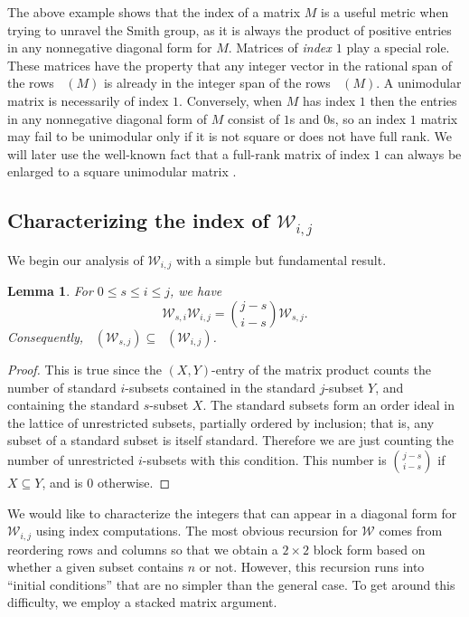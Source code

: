 \documentclass[11pt]{article}
\newtheorem{lemma}[theo]{Lemma}
\theoremstyle{definition}
\numberwithin{equation}{section}
\numberwithin{equation}{section}
\DeclareMathOperator{\rowz}{row_{\mathbb{Z}}}
\DeclareMathOperator{\rowq}{row_{\mathbb{Q}}}
\newcommand{\W}{\mathcal{W}}
\begin{document}
The above example shows that the index of a matrix $M$ is a useful metric when trying to unravel the Smith group, as it is always the product of positive entries in any nonnegative diagonal form for $M$.  Matrices of {\em index $\mathit 1$} play a special role.  These matrices have the property that any integer vector in the rational span of the rows $\rowq(M)$ is already in the integer span of the rows $\rowz(M)$.  A unimodular matrix is necessarily of index $1$.  Conversely, when $M$ has index $1$ then the entries in any nonnegative diagonal form of $M$ consist of $1$s and $0$s, so an index $1$ matrix may fail to be unimodular only if it is not square or does not have full rank.  We will later use the well-known fact that a full-rank matrix of index $1$ can always be enlarged to a square unimodular matrix \cite[Proposition 2]{wilson_classic}.

\subsection{Characterizing the index of \texorpdfstring{$\W_{i,j}$}{Wij}}

We begin our analysis of $\W_{i,j}$ with a simple but fundamental result.

\begin{lemma}\label{l:fund}  For $0 \leq s \leq i \leq j$, we have
\begin{equation*}
\W_{s,i}\W_{i,j} = \binom{j-s}{i-s}\W_{s,j}.
\end{equation*}
Consequently, $\rowq(\W_{s,j}) \subseteq \rowq(\W_{i,j})$.
\end{lemma}
\begin{proof}
This is true since the $(X,Y)$-entry of the matrix product counts the number of standard $i$-subsets contained in the standard $j$-subset $Y$, and containing the standard $s$-subset $X$.  The standard subsets form an order ideal in the lattice of unrestricted subsets, partially ordered by inclusion; that is, any subset of a standard subset is itself standard.  Therefore we are just counting the number of unrestricted $i$-subsets with this condition.  This number is $\binom{j-s}{i-s}$ if $X \subseteq Y$, and is $0$ otherwise.
\end{proof}

We would like to characterize the integers that can appear in a diagonal form for $\W_{i,j}$ using index computations.  The most obvious recursion for $\W$ comes from reordering rows and columns so that we obtain a $2 \times 2$ block form based on whether a given subset contains $n$ or not.  However, this recursion runs into ``initial conditions'' that are no simpler than the general case.  To get around this difficulty, we employ a stacked matrix argument.  
\end{document}
